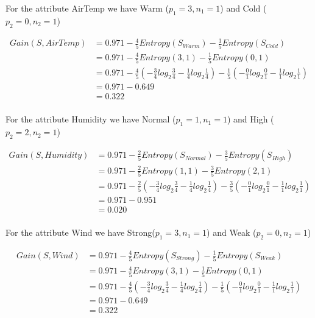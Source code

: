 \documentclass[10pt,a4paper]{article}
\begin{document}
{{{{{{{{{{For the attribute AirTemp we have Warm ($p_1=3,n_1=1$) and Cold ($p_2=0,n_2=1$)

\begin{equation}
\begin{split}
Gain(S,AirTemp) &= 0.971 - \frac{4}{5} Entropy(S_{Warm} ) - \frac{1}{5}Entropy(S_{Cold}) \\
          &= 0.971 - \frac{4}{5} Entropy(3,1) - \frac{1}{5}Entropy(0,1) \\
          &= 0.971 -\frac{4}{5} ( -\frac{3}{4} log_2\frac{3}{4} -\frac{1}{4} log_2\frac{1}{4} ) - \frac{1}{5}(-\frac{0}{1} log_2\frac{0}{1} - \frac{1}{1}log_2\frac{1}{1} ) \\
          &= 0.971 - 0.649\\
          &= 0.322 \\
\end{split}
\end{equation}

For the attribute Humidity we have Normal ($p_1=1,n_1=1$) and High ($p_2=2,n_2=1$)

\begin{equation}
\begin{split}
Gain(S,Humidity) &= 0.971 - \frac{2}{5} Entropy(S_{Normal} ) - \frac{3}{5}Entropy(S_{High}) \\
          &= 0.971 - \frac{2}{5} Entropy(1,1) - \frac{3}{5}Entropy(2,1) \\
          &= 0.971 -\frac{2}{5} ( -\frac{3}{4} log_2\frac{3}{4} -\frac{1}{4} log_2\frac{1}{4} ) -           \frac{3}{5}(-\frac{0}{1} log_2\frac{0}{1} - \frac{1}{1}log_2\frac{1}{1} ) \\
          &= 0.971 - 0.951\\
          &= 0.020 \\
\end{split}
\end{equation}

For the attribute Wind we have Strong($p_1=3,n_1=1$) and Weak ($p_2=0,n_2=1$)

\begin{equation}
\begin{split}
Gain(S,Wind) &= 0.971 - \frac{4}{5} Entropy(S_{Strong} ) - \frac{1}{5}Entropy(S_{Weak}) \\
          &= 0.971 - \frac{4}{5} Entropy(3,1) - \frac{1}{5}Entropy(0,1) \\
          &= 0.971 -\frac{4}{5} ( -\frac{3}{4} log_2\frac{3}{4} -\frac{1}{4} log_2\frac{1}{4} ) - \frac{1}{5}(-\frac{0}{1} log_2\frac{0}{1} - \frac{1}{1}log_2\frac{1}{1} ) \\
          &= 0.971 - 0.649\\
          &= 0.322 \\
\end{split}
\end{equation}

}}}}}}}}}}
\end{document}
